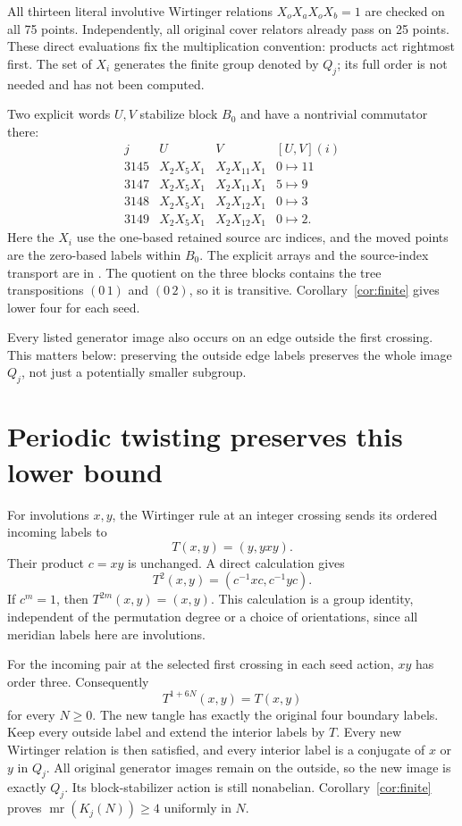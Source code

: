 \documentclass[11pt]{article}
\newcommand{\mr}{\operatorname{mr}}
\begin{document}
All thirteen literal involutive Wirtinger relations
$X_oX_aX_oX_b=1$ are checked on all 75 points. Independently,
all original cover relators already pass on 25 points.
These direct evaluations fix the multiplication convention:
products act rightmost first. The set of $X_i$ generates
the finite group denoted by $Q_j$; its full order is not
needed and has not been computed.

Two explicit words $U,V$ stabilize block $B_0$ and have a
nontrivial commutator there:
\[
\begin{array}{c|cc|c}
j&U&V&[U,V](i)\\\hline
3145&X_2X_5X_1&X_2X_{11}X_1&0\mapsto11\\
3147&X_2X_5X_1&X_2X_{11}X_1&5\mapsto9\\
3148&X_2X_5X_1&X_2X_{12}X_1&0\mapsto3\\
3149&X_2X_5X_1&X_2X_{12}X_1&0\mapsto2.
\end{array}
\]
Here the $X_i$ use the one-based retained source arc indices,
and the moved points are the zero-based labels within $B_0$.
The explicit arrays and the source-index transport are in
.
The quotient on the three blocks contains the tree
transpositions $(0\,1)$ and $(0\,2)$, so it is transitive.
Corollary~\ref{cor:finite} gives lower four for each seed.

Every listed generator image also occurs on an edge outside
the first crossing. This matters below: preserving the
outside edge labels preserves the whole image $Q_j$, not
just a potentially smaller subgroup.

\section{Periodic twisting preserves this lower bound}

For involutions $x,y$, the Wirtinger rule at an integer
crossing sends its ordered incoming labels to
\[
                    T(x,y)=(y,yxy).
\]
Their product $c=xy$ is unchanged. A direct calculation gives
\[
                 T^2(x,y)=(c^{-1}xc,c^{-1}yc).
\]
If $c^m=1$, then $T^{2m}(x,y)=(x,y)$.
This calculation is a group identity, independent of the
permutation degree or a choice of orientations, since all
meridian labels here are involutions.

For the incoming pair at the selected first crossing in
each seed action, $xy$ has order three. Consequently
\[
                         T^{1+6N}(x,y)=T(x,y)
\]
for every $N\ge0$. The new tangle has exactly the original
four boundary labels. Keep every outside label and extend
the interior labels by $T$. Every new Wirtinger relation
is then satisfied, and every interior label is a conjugate
of $x$ or $y$ in $Q_j$. All original generator images remain
on the outside, so the new image is exactly $Q_j$.
Its block-stabilizer action is still nonabelian.
Corollary~\ref{cor:finite} proves
$\mr(K_j(N))\ge4$ uniformly in $N$.
\end{document}
